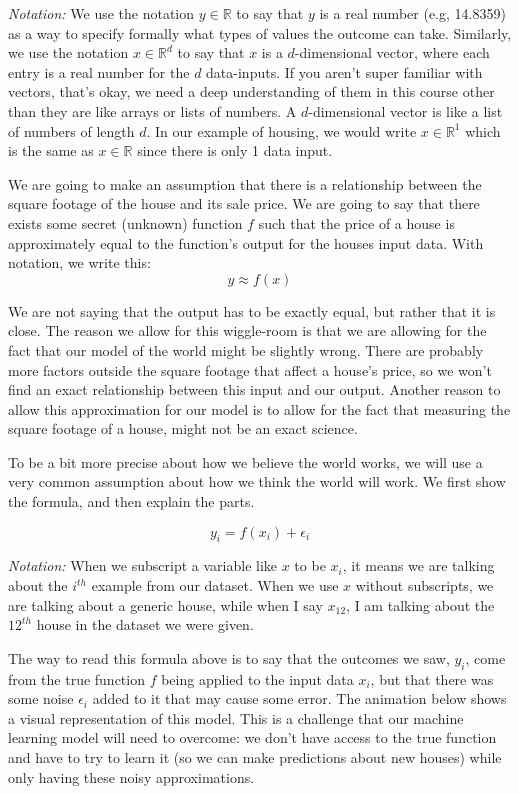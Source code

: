 \documentclass{article}
\begin{document}
\textit{Notation:} We use the notation $y \in \mathbb{R}$ to say that $y$ is a real number (e.g, 14.8359) as a way to specify formally what types of values the outcome can take. Similarly, we use the notation $x \in \mathbb{R}^d$ to say that $x$ is a $d$-dimensional vector, where each entry is a real number for the $d$ data-inputs. If you aren't super familiar with vectors, that's okay, we need a deep understanding of them in this course other than they are like arrays or lists of numbers. A $d$-dimensional vector is like a list of numbers of length $d$. In our example of housing, we would write $x \in \mathbb{R}^1$ which is the same as $x \in \mathbb{R}$ since there is only 1 data input.

We are going to make an assumption that there is a relationship between the square footage of the house and its sale price. We are going to say that there exists some secret (unknown) function $f$ such that the price of a house is approximately equal to the function's output for the houses input data. With notation, we write this:
$$y \approx f(x)$$

We are not saying that the output has to be exactly equal, but rather that it is close. The reason we allow for this wiggle-room is that we are allowing for the fact that our model of the world might be slightly wrong. There are probably more factors outside the square footage that affect a house's price, so we won't find an exact relationship between this input and our output. Another reason to allow this approximation for our model is to allow for the fact that measuring the square footage of a house, might not be an exact science.

To be a bit more precise about how we believe the world works, we will use a very common assumption about how we think the world will work. We first show the formula, and then explain the parts.

$$y_i = f(x_i) + \epsilon_i$$

\textit{Notation:} When we subscript a variable like $x$ to be $x_i$, it means we are talking about the $i^{th}$ example from our dataset. When we use $x$ without subscripts, we are talking about a generic house, while when I say $x_{12}$, I am talking about the $12^{th}$ house in the dataset we were given.

The way to read this formula above is to say that the outcomes we saw, $y_i$, come from the true function $f$ being applied to the input data $x_i$, but that there was some noise $\epsilon_i$ added to it that may cause some error. The animation below shows a visual representation of this model. This is a challenge that our machine learning model will need to overcome: we don't have access to the true function and have to try to learn it (so we can make predictions about new houses) while only having these noisy approximations.
\end{document}
